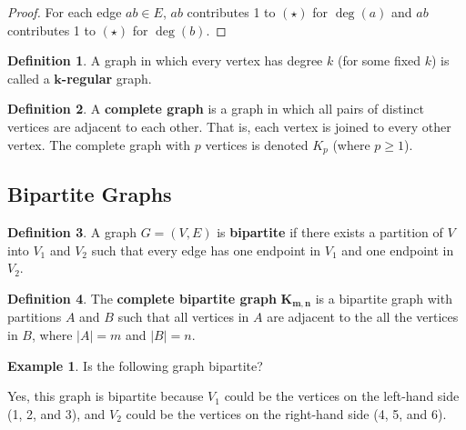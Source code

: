 \documentclass[]{article}
\theoremstyle{definition}
\newtheorem*{defn}{Definition}
\newtheorem{ex}{Example}[section]
\begin{document}
			\begin{proof}
				For each edge $ab \in E$, $ab$ contributes 1 to $(\star)$ for $\deg(a)$ and $ab$ contributes 1 to $(\star)$ for $\deg(b)$.
			\end{proof}

			\begin{defn}
				A graph in which every vertex has degree $k$ (for some fixed $k$) is called a \textbf{$\boldsymbol{k}$-regular} graph.
			\end{defn}

			\begin{defn}
				A \textbf{complete graph} is a graph in which all pairs of distinct vertices are adjacent to each other. That is, each vertex is joined to every other vertex. The complete graph with $p$ vertices is denoted $K_p$ (where $p \ge 1$).
			\end{defn}

		\subsection{Bipartite Graphs}
			\begin{defn}
				A graph $G = (V, E)$ is \textbf{bipartite} if there exists a partition of $V$ into $V_1$ and $V_2$ such that every edge has one endpoint in $V_1$ and one endpoint in $V_2$.
			\end{defn}

			\begin{defn}
				The \textbf{complete bipartite graph} $\boldsymbol{K_{m,n}}$ is a bipartite graph with partitions $A$ and $B$ such that all vertices in $A$ are adjacent to the all the vertices in $B$, where $|A| = m$ and $|B| = n$.
			\end{defn}

			\begin{ex}
				Is the following graph bipartite?
				\begin{center}
				\end{center}
				Yes, this graph is bipartite because $V_1$ could be the vertices on the left-hand side (1, 2, and 3), and $V_2$ could be the vertices on the right-hand side (4, 5, and 6).
			\end{ex}
\end{document}
